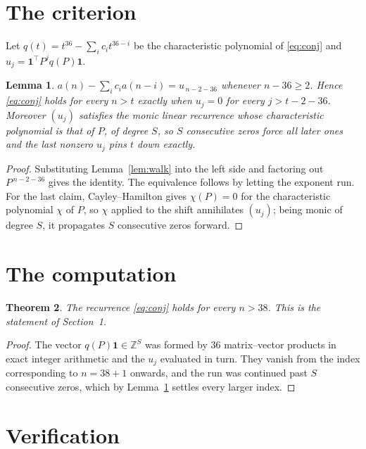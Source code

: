 \documentclass[11pt,a4paper]{article}
\theoremstyle{plain}
\newtheorem{theorem}{Theorem}
\newtheorem{lemma}[theorem]{Lemma}
\theoremstyle{definition}
\begin{document}
\section{The criterion}

Let $q(t)=t^{36}-\sum_i c_i t^{36-i}$ be the characteristic polynomial of
\eqref{eq:conj} and $u_j=\mathbf{1}^{\!\top}P^{j}q(P)\mathbf{1}$.

\begin{lemma}\label{lem:crit}
$a(n)-\sum_i c_i a(n-i)=u_{\,n-2-36}$ whenever $n-36\ge2$. Hence
\eqref{eq:conj} holds for every $n>t$ exactly when $u_j=0$ for every
$j>t-2-36$. Moreover $(u_j)$ satisfies the monic linear recurrence whose
characteristic polynomial is that of $P$, of degree $S$, so $S$ consecutive zeros force all
later ones and the last nonzero $u_j$ pins $t$ down exactly.
\end{lemma}

\begin{proof}
Substituting Lemma~\ref{lem:walk} into the left side and factoring out
$P^{\,n-2-36}$ gives the identity. The equivalence follows by letting the exponent
run. For the last claim, Cayley--Hamilton gives $\chi(P)=0$ for the characteristic
polynomial $\chi$ of $P$, so $\chi$ applied to the shift annihilates $(u_j)$; being monic of
degree $S$, it propagates $S$ consecutive zeros forward.
\end{proof}

\section{The computation}

\begin{theorem}
The recurrence \eqref{eq:conj} holds for every $n>38$. This is the statement of
Section~1.
\end{theorem}

\begin{proof}
The vector $q(P)\mathbf{1}\in\mathbb{Z}^{S}$ was formed by $36$ matrix--vector
products in exact integer arithmetic and the $u_j$ evaluated in turn. They vanish from the
index corresponding to $n=38+1$ onwards, and the run was continued past $S$ consecutive
zeros, which by Lemma~\ref{lem:crit} settles every larger index.
\end{proof}

\section{Verification}
\end{document}
